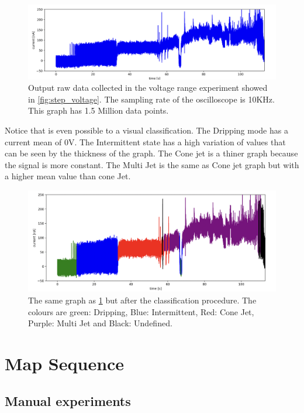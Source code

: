 \begin{figure}[H]
    \center
    \includegraphics[width=12cm]{Figuras/19:03/raw-data-example.png}
    \caption{Output raw data collected in the voltage range experiment showed in \ref{fig:step_voltage}. The sampling rate of the oscilloscope is 10KHz. This graph has 1.5 Million data points.}
    \label{fig:raw_data}
\end{figure}

Notice that is even possible to a visual classification. The Dripping mode has a current mean of 0V. The Intermittent state has a high variation of values that can be seen by the thickness of the graph. The Cone jet is a thiner graph because the signal is more constant. The Multi Jet is the same as Cone jet graph but with a higher mean value than cone Jet.


\begin{figure}[H]
    \center
    \includegraphics[width=12cm]{Figuras/19:03/classified-data-example.png}
    \caption{The same graph as \ref{fig:raw_data} but after the classification procedure. The colours are green: Dripping, Blue: Intermittent, Red: Cone Jet, Purple: Multi Jet and Black: Undefined.}
    \label{fig:class_step_data}
\end{figure}


\section{Map Sequence}
\label{sec:map_results}



    \subsection{Manual experiments}



